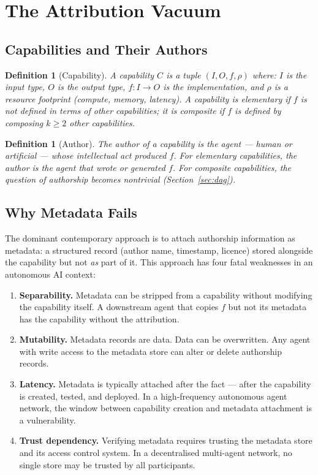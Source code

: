 \documentclass[12pt]{article}
\newtheorem{definition}[theorem]{Definition}
\begin{document}
\section{The Attribution Vacuum}
\label{sec:problem}

\subsection{Capabilities and Their Authors}

\begin{definition}[Capability]
  A \emph{capability} $C$ is a tuple $(I, O, f, \rho)$ where: $I$ is the input
  type, $O$ is the output type, $f : I \to O$ is the implementation, and
  $\rho$ is a resource footprint (compute, memory, latency).  A capability is
  \emph{elementary} if $f$ is not defined in terms of other capabilities; it is
  \emph{composite} if $f$ is defined by composing $k \ge 2$ other capabilities.
\end{definition}

\begin{definition}[Author]
  The \emph{author} of a capability is the agent — human or artificial — whose
  intellectual act produced $f$.  For elementary capabilities, the author is
  the agent that wrote or generated $f$.  For composite capabilities, the
  question of authorship becomes nontrivial (Section~\ref{sec:dag}).
\end{definition}

\subsection{Why Metadata Fails}

The dominant contemporary approach is to attach authorship information as
metadata: a structured record (author name, timestamp, licence) stored
alongside the capability but not \emph{as} part of it.  This approach has four
fatal weaknesses in an autonomous AI context:

\begin{enumerate}[label=(\arabic*)]
  \item \textbf{Separability.}  Metadata can be stripped from a capability
    without modifying the capability itself.  A downstream agent that copies $f$
    but not its metadata has the capability without the attribution.
  \item \textbf{Mutability.}  Metadata records are data.  Data can be
    overwritten.  Any agent with write access to the metadata store can alter
    or delete authorship records.
  \item \textbf{Latency.}  Metadata is typically attached after the fact —
    after the capability is created, tested, and deployed.  In a high-frequency
    autonomous agent network, the window between capability creation and metadata
    attachment is a vulnerability.
  \item \textbf{Trust dependency.}  Verifying metadata requires trusting the
    metadata store and its access control system.  In a decentralised multi-agent
    network, no single store may be trusted by all participants.
\end{enumerate}
\end{document}
